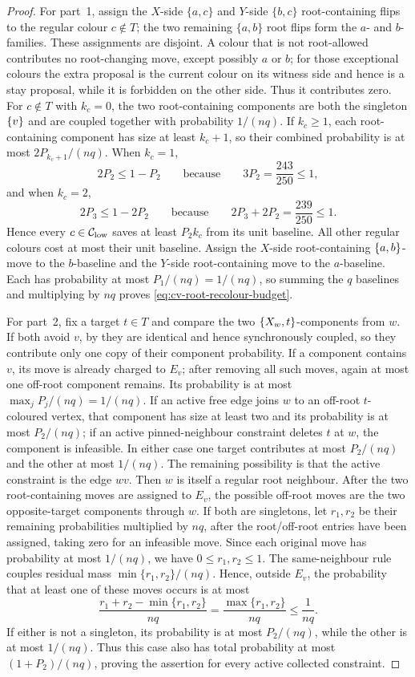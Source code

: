 \begin{proof}
For part~1, assign the \(X\)-side \(\{a,c\}\) and \(Y\)-side
\(\{b,c\}\) root-containing flips to the regular colour \(c\notin T\);
the two remaining \(\{a,b\}\) root flips form the \(a\)- and
\(b\)-families.  These assignments are disjoint.  A
colour that is not root-allowed contributes no root-changing move, except possibly
$a$ or $b$; for those exceptional colours the extra proposal is the
current colour on its witness side and hence is a stay proposal, while it
is forbidden on the other side. Thus it contributes zero. For
$c\notin T$ with $k_c=0$, the two root-containing components are both the
singleton $\left\{v\right\}$ and are coupled together with probability $1/(nq)$.
If $k_c\ge1$, each root-containing component has size at least
$k_c+1$, so their combined probability is at most $2P_{k_c+1}/(nq)$. When
$k_c=1$,
\[
  2P_2\le1-P_2
  \qquad\text{because}\qquad 3P_2=\frac{243}{250}\le1,
\]
and when $k_c=2$,
\[
  2P_3\le1-2P_2
  \qquad\text{because}\qquad
  2P_3+2P_2=\frac{239}{250}\le1 .
\]
Hence every $c\in\mathcal C_{\rm low}$ saves at least $P_2k_c$ from its
unit baseline. All other regular colours cost at most their unit
baseline. Assign the $X$-side root-containing $\left\{a,b\right\}$-move to the
$b$-baseline and the $Y$-side root-containing move to the $a$-baseline.
Each has probability at most
$P_1/(nq)=1/(nq)$, so summing the $q$ baselines and multiplying by $nq$ proves
\eqref{eq:cv-root-recolour-budget}.

For part~2, fix a target $t\in T$ and compare the two
$\left\{X_w,t\right\}$-components from $w$. If both avoid $v$,
by  they are identical and hence
synchronously coupled, so they contribute only one copy of their component
probability. If a component contains $v$, its move is already charged to
$E_v$; after removing all such moves, again at most one off-root component
remains. Its probability is at most $\max_jP_j/(nq)=1/(nq)$. If an active free edge
joins $w$ to an off-root $t$-coloured vertex, that component has size at
least two and its probability is at most $P_2/(nq)$; if an active pinned-neighbour constraint deletes
$t$ at $w$, the component is infeasible. In either case one target
contributes at most $P_2/(nq)$ and the other at most $1/(nq)$.
The remaining possibility is that the active constraint is the edge
$wv$. Then $w$ is itself a regular root neighbour. After the two
root-containing moves are assigned to $E_v$, the possible off-root moves
are the two opposite-target components through $w$. If both are
singletons, let $r_1,r_2$ be their remaining probabilities multiplied by
$nq$, after the root/off-root entries have been assigned, taking zero for
an infeasible move. Since each original move has probability at most
$1/(nq)$, we have $0\le r_1,r_2\le1$.
The same-neighbour rule couples residual mass $\min\{r_1,r_2\}/(nq)$.
Hence, outside $E_v$, the probability that at least one of these moves
occurs is at most
\[
 \frac{r_1+r_2-\min\{r_1,r_2\}}{nq}
 =\frac{\max\{r_1,r_2\}}{nq}\le\frac1{nq}.
\]
If either is not a singleton, its probability is
at most $P_2/(nq)$, while the other is at most $1/(nq)$. Thus this case also
has total probability at most $(1+P_2)/(nq)$, proving the assertion for every active
collected constraint.


\end{proof}
